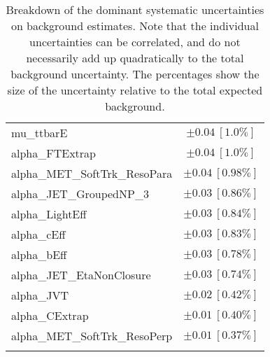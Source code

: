 \begin{table}
\begin{center}
\begin{tabular*}{\textwidth}{@{\extracolsep{\fill}}lc}
mu\_ttbarE         & $\pm 0.04\ [1.0\%] $       \\
alpha\_FTExtrap         & $\pm 0.04\ [1.0\%] $       \\
alpha\_MET\_SoftTrk\_ResoPara         & $\pm 0.04\ [0.98\%] $       \\
alpha\_JET\_GroupedNP\_3         & $\pm 0.03\ [0.86\%] $       \\
alpha\_LightEff         & $\pm 0.03\ [0.84\%] $       \\
alpha\_cEff         & $\pm 0.03\ [0.83\%] $       \\
alpha\_bEff         & $\pm 0.03\ [0.78\%] $       \\
alpha\_JET\_EtaNonClosure         & $\pm 0.03\ [0.74\%] $       \\
alpha\_JVT         & $\pm 0.02\ [0.42\%] $       \\
alpha\_CExtrap         & $\pm 0.01\ [0.40\%] $       \\
alpha\_MET\_SoftTrk\_ResoPerp         & $\pm 0.01\ [0.37\%] $       \\
\noalign{\smallskip}\hline\noalign{\smallskip}
\end{tabular*}
\end{center}
\caption[Breakdown of uncertainty on background estimates]{
Breakdown of the dominant systematic uncertainties on background estimates.
Note that the individual uncertainties can be correlated, and do not necessarily add up quadratically to 
the total background uncertainty. The percentages show the size of the uncertainty relative to the total expected background.
\label{table.results.bkgestimate.uncertainties.SRE}}
\end{table}
%
